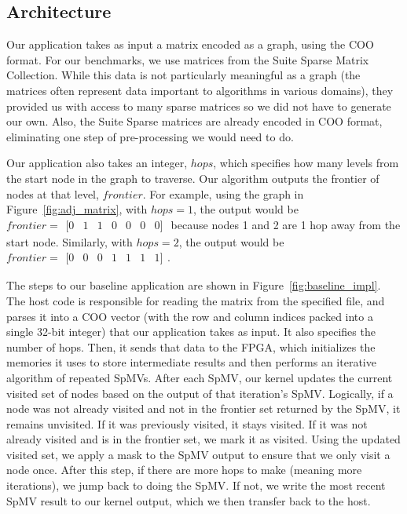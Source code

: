 \documentclass[10pt]{article}
\newcommand{\irow}[1]{%
  \begin{smallmatrix}[#1]\end{smallmatrix}%
}
\begin{document}
\subsection{Architecture}


Our application takes as input a matrix encoded as a graph, using the COO
format. For our benchmarks, we use matrices from the Suite Sparse Matrix
Collection. While this data is not particularly meaningful as a graph (the
matrices often represent data important to algorithms in various domains), they
provided us with access to many sparse matrices so we did not have to generate
our own. Also, the Suite Sparse matrices are already encoded in COO format,
eliminating one step of pre-processing we would need to do. 

Our application also takes an integer, $hops$, which specifies how many levels
from the start node in the graph to traverse. Our algorithm outputs the frontier
of nodes at that level, $frontier$. For example, using the graph in
Figure~\ref{fig:adj_matrix}, with $hops=1$, the output would be $frontier =
\irow{0 & 1 & 1 & 0 & 0 & 0 & 0}$ because nodes 1 and 2 are 1 hop away from the
start node. Similarly, with $hops=2$, the output would be $frontier=\irow{0 & 0
& 0 & 1 & 1 & 1 & 1}$.

The steps to our baseline application are shown in
Figure~\ref{fig:baseline_impl}. The host code is responsible for reading the
matrix from the specified file, and parses it into a COO vector (with the row
and column indices packed into a single 32-bit integer) that our application
takes as input. It also specifies the number of hops. Then, it sends that data
to the FPGA, which initializes the memories it uses to store intermediate
results and then performs an iterative algorithm of repeated SpMVs. After each
SpMV, our kernel updates the current visited set of nodes based on the output of
that iteration's SpMV. Logically, if a node was not already visited and not in
the frontier set returned by the SpMV, it remains unvisited. If it was
previously visited, it stays visited. If it was not already visited and is in
the frontier set, we mark it as visited. Using the updated visited set, we apply
a mask to the SpMV output to ensure that we only visit a node once. After this
step, if there are more hops to make (meaning more iterations), we jump back to
doing the SpMV. If not, we write the most recent SpMV result to our kernel
output, which we then transfer back to the host.
\end{document}
